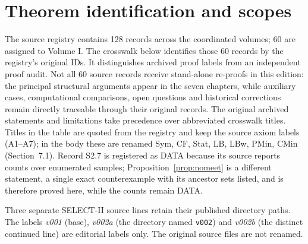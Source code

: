 \documentclass[11pt,oneside,openany]{book}
\theoremstyle{definition}
\theoremstyle{remark}
\begin{document}
\appendix
\chapter{Theorem identification and scopes}\label{app:crosswalk}
The source registry contains 128 records across the coordinated volumes; 60 are assigned to Volume I. The crosswalk below identifies those 60 records by the registry's original IDs. It distinguishes archived proof labels from an independent proof audit. Not all 60 source records receive stand-alone re-proofs in this edition: the principal structural arguments appear in the seven chapters, while auxiliary cases, computational comparisons, open questions and historical corrections remain directly traceable through their original records. The original archived statements and limitations take precedence over abbreviated crosswalk titles. Titles in the table are quoted from the registry and keep the source axiom labels (A1--A7); in the body these are renamed Sym, CF, Stat, LB, LBw, PMin, CMin (Section~7.1). Record S2.7 is registered as DATA because its source reports counts over enumerated samples; Proposition~\ref{prop:nomeet} is a different statement, a single exact counterexample with its ancestor sets listed, and is therefore proved here, while the counts remain DATA.

Three separate SELECT-II source lines retain their published directory paths. The labels \emph{v001} (base), \emph{v002a} (the directory named \texttt{v002}) and \emph{v002b} (the distinct continued line) are editorial labels only. The original source files are not renamed.
\end{document}
